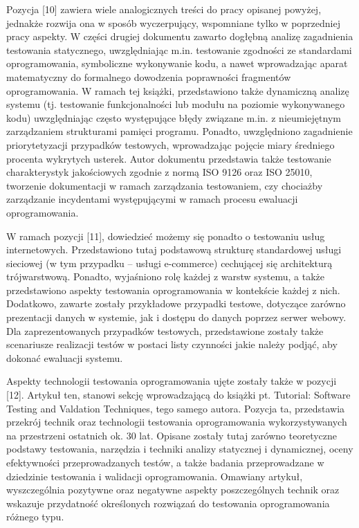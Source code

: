 Pozycja [10] zawiera wiele analogicznych treści do pracy opisanej powyżej, jednakże rozwija ona w sposób wyczerpujący, wspomniane tylko w poprzedniej pracy aspekty. W części drugiej dokumentu zawarto dogłębną analizę zagadnienia testowania statycznego, uwzględniając m.in. testowanie zgodności ze standardami oprogramowania, symboliczne wykonywanie kodu, a nawet wprowadzając aparat matematyczny do formalnego dowodzenia poprawności fragmentów oprogramowania. W ramach tej książki, przedstawiono także dynamiczną analizę systemu (tj. testowanie funkcjonalności lub modułu na poziomie wykonywanego kodu) uwzględniając często występujące błędy związane m.in. z nieumiejętnym zarządzaniem strukturami pamięci programu. Ponadto, uwzględniono zagadnienie priorytetyzacji przypadków testowych, wprowadzając pojęcie miary średniego procenta wykrytych usterek. Autor dokumentu przedstawia także testowanie charakterystyk jakościowych zgodnie z normą ISO 9126 oraz ISO 25010, tworzenie dokumentacji w ramach zarządzania testowaniem, czy chociażby zarządzanie incydentami występującymi w ramach procesu ewaluacji oprogramowania.

W ramach pozycji [11], dowiedzieć możemy się ponadto o testowaniu usług internetowych. Przedstawiono tutaj podstawową strukturę standardowej usługi sieciowej (w tym przypadku – usługi e-commerce) cechującej się architekturą trójwarstwową. Ponadto, wyjaśniono rolę każdej z warstw systemu, a także przedstawiono aspekty testowania oprogramowania w kontekście każdej z nich. Dodatkowo, zawarte zostały przykładowe przypadki testowe, dotyczące zarówno prezentacji danych w systemie, jak i dostępu do danych poprzez serwer webowy. Dla zaprezentowanych przypadków testowych, przedstawione zostały także scenariusze realizacji testów w postaci listy czynności jakie należy podjąć, aby dokonać ewaluacji systemu.

Aspekty technologii testowania oprogramowania ujęte zostały także w pozycji [12]. Artykuł ten, stanowi sekcję wprowadzającą do książki pt. Tutorial: Software Testing and Valdation Techniques, tego samego autora. Pozycja ta, przedstawia przekrój technik oraz technologii testowania oprogramowania wykorzystywanych na przestrzeni ostatnich ok. 30 lat. Opisane zostały tutaj zarówno teoretyczne podstawy testowania, narzędzia i techniki analizy statycznej i dynamicznej, oceny efektywności przeprowadzanych testów, a także badania przeprowadzane w dziedzinie testowania i walidacji oprogramowania. Omawiany artykuł, wyszczególnia pozytywne oraz negatywne aspekty poszczególnych technik oraz wskazuje przydatność określonych rozwiązań do testowania oprogramowania różnego typu.

